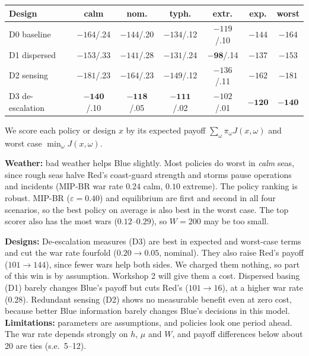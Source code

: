 
\noindent\begin{minipage}[t]{0.47\textwidth}\vspace{0pt}\centering\footnotesize\setlength{\tabcolsep}{2pt}
{\begin{tabular}{l|cccc|cc}
\toprule
Design & calm & nom. & typh. & extr. & exp. & worst\\\midrule
D0 baseline   & $-164$/.24 & $-144$/.20 & $-134$/.12 & $-119$/.10 & $-144$ & $-164$\\
D1 dispersed  & $-153$/.33 & $-141$/.28 & $-131$/.24 & $\mathbf{-98}$/.14  & $-137$ & $-153$\\
D2 sensing    & $-181$/.23 & $-164$/.23 & $-149$/.12 & $-136$/.11 & $-162$ & $-181$\\
D3 de-escalation & $\mathbf{-140}$/.10 & $\mathbf{-118}$/.05 & $\mathbf{-111}$/.02 & $-102$/.01 & $\mathbf{-120}$ & $\mathbf{-140}$\\
\bottomrule
\end{tabular}}
\label{fig:rq3}
\smallskip\normalsize\raggedright We score each policy or design $x$ by its expected payoff
$\sum_\omega\pi_\omega J(x,\omega)$ and worst case $\min_\omega J(x,\omega)$.
\end{minipage}\hfill
\begin{minipage}[t]{0.51\textwidth}\vspace{0pt}
\textbf{Weather:} bad weather helps Blue slightly. Most policies do worst in \emph{calm} seas, since rough seas halve
Red's coast-guard strength and storms pause operations and incidents (MIP-BR war rate $0.24$ calm, $0.10$ extreme).
The policy ranking is robust. MIP-BR ($\varepsilon=0.40$) and equilibrium are first and second in all four
scenarios, so the best policy on average is also best in the worst case. The top scorer also has the most
wars ($0.12$--$0.29$), so $W=200$ may be too small.
\end{minipage}

\textbf{Designs:} De-escalation measures (D3) are best in expected and worst-case terms and cut the war rate fourfold
($0.20\to0.05$, nominal). They also raise Red's payoff ($101\to144$), since fewer wars help both sides. We charged them
nothing, so part of this win is by assumption. Workshop 2 will give them a cost. Dispersed basing (D1) barely
changes Blue's payoff but cuts Red's ($101\to16$), at a higher war rate ($0.28$). Redundant sensing (D2) shows no
measurable benefit even at zero cost, because better Blue information barely changes Blue's decisions in this model.
\textbf{Limitations:} parameters are assumptions, and policies look one period ahead. The war rate depends strongly on
$h$, $\mu$ and $W$, and payoff differences below about 20 are ties (s.e.\ 5--12).
